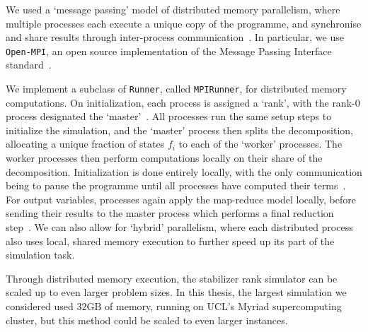We used a `message passing' model of distributed memory parallelism, where multiple processes each execute a unique copy of the programme, and synchronise and share results through inter-process communication~\cite{Kessler2007}. In particular, we use \texttt{Open-MPI}, an open source implementation of the Message Passing Interface standard~\cite{OpenMPI,MPIForum}.\par
We implement a subclass of \texttt{Runner}, called \texttt{MPIRunner}, for distributed memory computations. On initialization, each process is assigned a `rank', with the rank-0 process designated the `master'~\cite{MPIForum}. All processes run the same setup steps to initialize the simulation, and the `master' process then splits the decomposition, allocating a unique fraction of states $f_{i}$ to each of the `worker' processes. The worker processes then perform computations locally on their share of the decomposition. Initialization is done entirely locally, with the only communication being to pause the programme until all processes have computed their terms~\cite{MPIForum}. For output variables, processes again apply the map-reduce model locally, before sending their results to the master process which performs a final reduction step~\cite{MPIForum}. We can also allow for `hybrid' parallelism, where each distributed process also uses local, shared memory execution to further speed up its part of the simulation task.\par
Through distributed memory execution, the stabilizer rank simulator can be scaled up to even larger problem sizes. In this thesis, the largest simulation we considered used $32\mathrm{GB}$ of memory, running on UCL's Myriad supercomputing cluster, but this method could be scaled to even larger instances.
